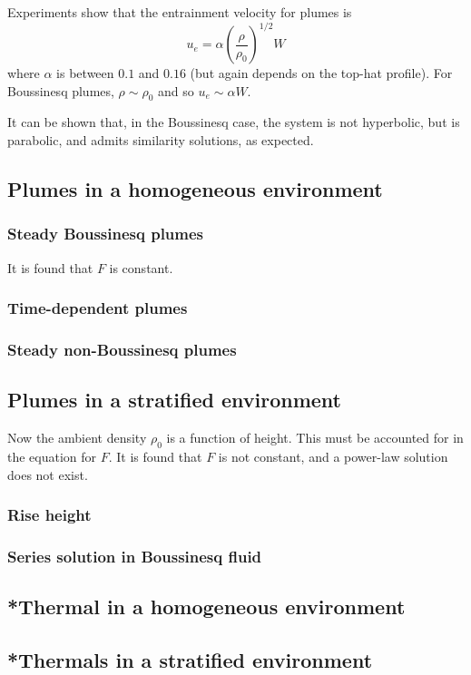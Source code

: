 Experiments show that the entrainment velocity for plumes is 
\begin{equation}
 u_e = \alpha \left(\frac{\rho}{\rho_0}\right)^{1/2} W
\end{equation}
where $\alpha$ is between $0.1$ and $0.16$ (but again depends on the top-hat profile). For Boussinesq plumes, $\rho\sim\rho_0$ and so $u_e \sim \alpha W$. 

It can be shown that, in the Boussinesq case, the system is not hyperbolic, but is parabolic, and admits similarity solutions, as expected. 

\subsection{Plumes in a homogeneous environment}
\subsubsection{Steady Boussinesq plumes}

It is found that $F$ is constant. 

\subsubsection{Time-dependent plumes}
\subsubsection{Steady non-Boussinesq plumes}

\subsection{Plumes in a stratified environment}

Now the ambient density $\rho_0$ is a function of height. This must be accounted for in the equation for $F$. It is found that $F$ is not constant, and a power-law solution does not exist.

\subsubsection{Rise height}
\subsubsection{Series solution in Boussinesq fluid}

\subsection{*Thermal in a homogeneous environment}
\subsection{*Thermals in a stratified environment}
